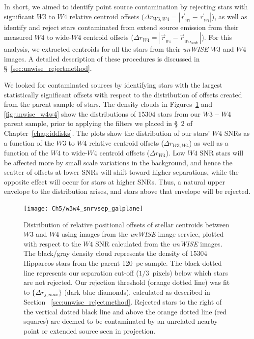     In short, we aimed to identify point source contamination by rejecting stars with significant $W3$ to $W4$ relative centroid offsets ($\Delta r_{W3,W4} = \left|\vec{r}_{_{W3}} - \vec{r}_{_{W4}}\right|$), as well as identify and reject stars contaminated from extend source emission from their measured $W4$ to wide-$W4$ centroid offsets ($\Delta r_{W4} = \left|\vec{r}_{_{W4}} - \vec{r}_{_{W4},_{wide}}\right|$). For this analysis, we extracted centroids for all the stars from their \textit{unWISE} $W3$ and $W4$ images. A detailed description of these procedures is discussed in \S~\ref{sec:unwise_rejectmethod}. 
    
    We looked for contaminated sources by identifying stars with the largest statistically significant offsets with respect to the distribution of offsets created from the parent sample of stars. The density clouds in Figures~\ref{fig:unwise_w3w4} and \ref{fig:unwise_w4w4} show the distributions of 15304 stars from our $W3-W4$ parent sample, prior to applying the filters we placed in \S~2 of Chapter~\ref{chap:iddisks}. The plots show the distribution of our stars' $W4$ SNRs as a function of the $W3$ to $W4$ relative centroid offsets ($\Delta r_{W3,W4}$) as well as a function of the $W4$ to wide-$W4$ centroid offsets ($\Delta r_{W4}$). Low $W4$ SNR stars will be affected more by small scale variations in the background, and hence the scatter of offsets at lower SNRs will shift toward higher separations, while the opposite effect will occur for stars at higher SNRs. Thus, a natural upper envelope to the distribution arises, and stars above that envelope will be rejected. 
    
    \begin{figure}
    \centering
    \texttt{[image: Ch5/w3w4\_snrvsep\_galplane]}
    \caption[Rejected \textit{unWISE} stars using $W3$ to $W4$ offsets]{Distribution of relative positional offsets of stellar centroids between $W3$ and $W4$ using images from the \textit{unWISE} image service, plotted with respect to the $W4$ SNR calculated from the \textit{unWISE} images. The black/gray density cloud represents the density of 15304 Hipparcos stars from the parent 120~pc sample. The black-dotted line represents our separation cut-off ($1/3$~pixels) below which stars are not rejected. Our rejection threshold (orange dotted line) was fit to $\{\Delta r_{j,max}\}$ (dark-blue diamonds), calculated as described in Section~ \ref{sec:unwise_rejectmethod}. Rejected stars to the right of the vertical dotted black line and above the orange dotted line (red squares) are deemed to be contaminated by an unrelated nearby point or extended source seen in projection.}
    \label{fig:unwise_w3w4}
    \end{figure}


